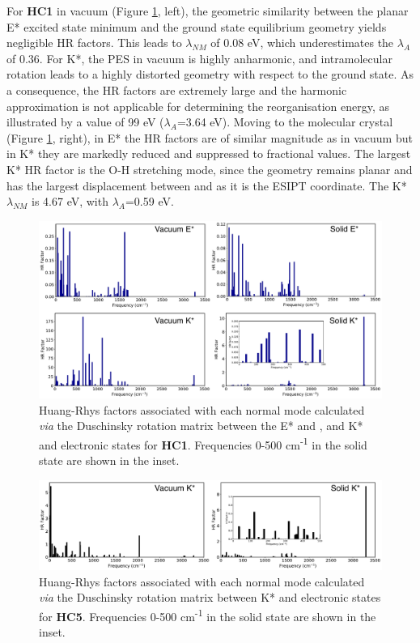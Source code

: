 For \textbf{HC1} in vacuum (Figure \ref{figure: HC1_DUSHIN}, left), the geometric similarity between the planar E* excited state minimum and the ground state equilibrium geometry yields negligible HR factors. This leads to $\lambda_{NM}$ of 0.08 eV, which underestimates the $\lambda_{A}$ of 0.36. For K*, the PES in vacuum is highly anharmonic, and intramolecular rotation leads to a highly distorted geometry with respect to the ground state. As a consequence, the HR factors are extremely large and the harmonic approximation is not applicable for determining the reorganisation energy, as illustrated by a value of 99 eV ($\lambda_{A}$=3.64 eV). Moving to the molecular crystal (Figure \ref{figure: HC1_DUSHIN}, right), in E* the HR factors are of similar magnitude as in vacuum but in K* they are markedly reduced and suppressed to fractional values. The largest K* HR factor is the O-H stretching mode, since the geometry remains planar and has the largest displacement between \szero{} and \sone{} as it is the ESIPT coordinate. The K* $\lambda_{NM}$ is 4.67 eV, with $\lambda_{A}$=0.59 eV. 

\begin{figure}[t]
\centering
  \includegraphics[width=\linewidth]{5ConnectingCrystalStructure/HC1_DUSHIN}
  \caption[HR factors for \textbf{HC1}]{Huang-Rhys factors associated with each normal mode calculated \textit{via} the Duschinsky rotation matrix between the E* and \szero{}, and K* and \szero{} electronic states for \textbf{HC1}. Frequencies 0-500 cm\textsuperscript{-1} in the solid state are shown in the inset.}
  \label{figure: HC1_DUSHIN}
\end{figure}

\begin{figure}[t]
\centering
  \includegraphics[width=\linewidth]{5ConnectingCrystalStructure/HC5_DUSHIN}
  \caption[HR factors for \textbf{HC5}]{Huang-Rhys factors associated with each normal mode calculated \textit{via} the Duschinsky rotation matrix between  K* and \szero{} electronic states for \textbf{HC5}. Frequencies 0-500 cm\textsuperscript{-1} in the solid state are shown in the inset.}
  \label{figure: HC5_DUSHIN}
\end{figure}

